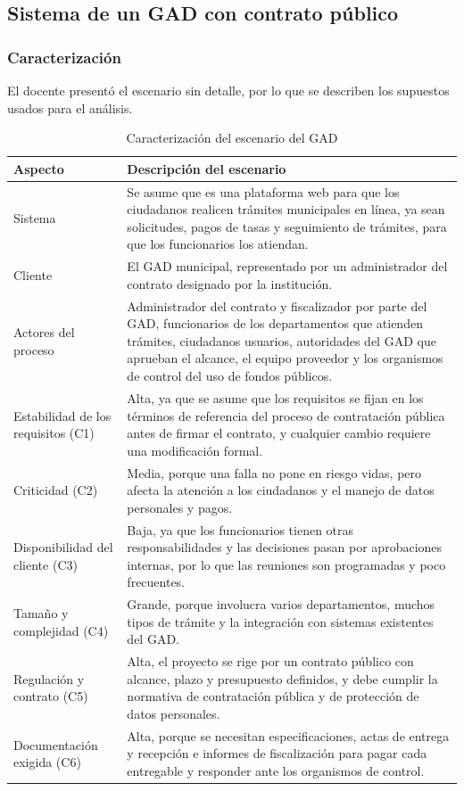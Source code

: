 \subsection{Sistema de un GAD con contrato público}

\subsubsection{Caracterización}
El docente presentó el escenario sin detalle, por lo que se describen los supuestos usados para el análisis.

\begin{table}[H]
\centering\footnotesize
\caption{Caracterización del escenario del GAD}\label{tab:gad}
\begin{tabularx}{\textwidth}{@{}p{}Y@{}}
\toprule
\textbf{Aspecto} & \textbf{Descripción del escenario}\\
\midrule
Sistema & Se asume que es una plataforma web para que los ciudadanos realicen trámites municipales en línea, ya sean solicitudes, pagos de tasas y seguimiento de trámites, para que los funcionarios los atiendan.\\
Cliente & El GAD municipal, representado por un administrador del contrato designado por la institución.\\
Actores del proceso & Administrador del contrato y fiscalizador por parte del GAD, funcionarios de los departamentos que atienden trámites, ciudadanos usuarios, autoridades del GAD que aprueban el alcance, el equipo proveedor y los organismos de control del uso de fondos públicos.\\
Estabilidad de los requisitos (C1) & Alta, ya que se asume que los requisitos se fijan en los términos de referencia del proceso de contratación pública antes de firmar el contrato, y cualquier cambio requiere una modificación formal.\\
Criticidad (C2) & Media, porque una falla no pone en riesgo vidas, pero afecta la atención a los ciudadanos y el manejo de datos personales y pagos.\\
Disponibilidad del cliente (C3) & Baja, ya que los funcionarios tienen otras responsabilidades y las decisiones pasan por aprobaciones internas, por lo que las reuniones son programadas y poco frecuentes.\\
Tamaño y complejidad (C4) & Grande, porque involucra varios departamentos, muchos tipos de trámite y la integración con sistemas existentes del GAD.\\
Regulación y contrato (C5) & Alta, el proyecto se rige por un contrato público con alcance, plazo y presupuesto definidos, y debe cumplir la normativa de contratación pública y de protección de datos personales.\\
Documentación exigida (C6) & Alta, porque se necesitan especificaciones, actas de entrega y recepción e informes de fiscalización para pagar cada entregable y responder ante los organismos de control.\\
\bottomrule
\end{tabularx}
\end{table}

